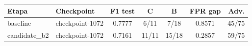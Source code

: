 \begin{tabular}{llccccr}
\toprule
Etapa & Checkpoint & F1 test & C & B & FPR gap & Adv. \\
\midrule
baseline & checkpoint-1072 & 0.7777 & 6/11 & 7/18 & 0.8571 & 45/75 \\
candidate\_b2 & checkpoint-1072 & 0.7161 & 11/11 & 15/18 & 0.2857 & 59/75 \\
\bottomrule
\end{tabular}

